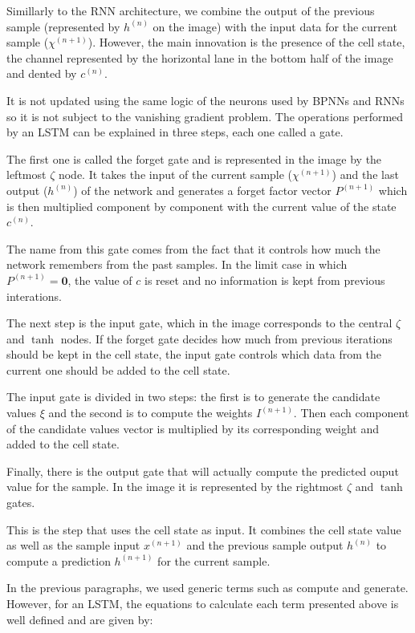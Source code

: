 Simillarly to the RNN architecture, we combine the output of the previous sample (represented by $h^{(n)}$ on the image) with the input data for the current sample ($\chi^{(n+1)}$).
However, the main innovation is the presence of the cell state, the channel represented by the horizontal lane in the bottom half of the image and dented by $c^{(n)}$.

It is not updated using the same logic of the neurons used by BPNNs and RNNs so it is not subject to the vanishing gradient problem.
The operations performed by an LSTM can be explained in three steps, each one called a gate.

The first one is called the forget gate and is represented in the image by the leftmost $\zeta$ node.
It takes the input of the current sample ($\chi^{(n+1)}$) and the last output ($h^{(n)}$) of the network and generates a forget factor vector $P^{(n+1)}$ which is then multiplied component by component with the current value of the state $c^{(n)}$.

The name from this gate comes from the fact that it controls how much the network remembers from the past samples.
In the limit case in which $P^{(n+1)} = \mathbf{0}$, the value of $c$ is reset and no information is kept from previous interations.

The next step is the input gate, which in the image corresponds to the central $\zeta$ and $\tanh$ nodes.
If the forget gate decides how much from previous iterations should be kept in the cell state, the input gate controls which data from the current one should be added to the cell state.

The input gate is divided in two steps: the first is to generate the candidate values $\xi$ and the second is to compute the weights $I^{(n+1)}$.
Then each component of the candidate values vector is multiplied by its corresponding weight and added to the cell state.

Finally, there is the output gate that will actually compute the predicted ouput value for the sample.
In the image it is represented by the rightmost $\zeta$ and $\tanh$ gates.

This is the step that uses the cell state as input.
It combines the cell state value as well as the sample input $x^{(n+1)}$ and the previous sample output $h^{(n)}$ to compute a prediction $h^{(n+1)}$ for the current sample. 

In the previous paragraphs, we used generic terms such as compute and generate.
However, for an LSTM, the equations to calculate each term presented above is well defined and are given by:

